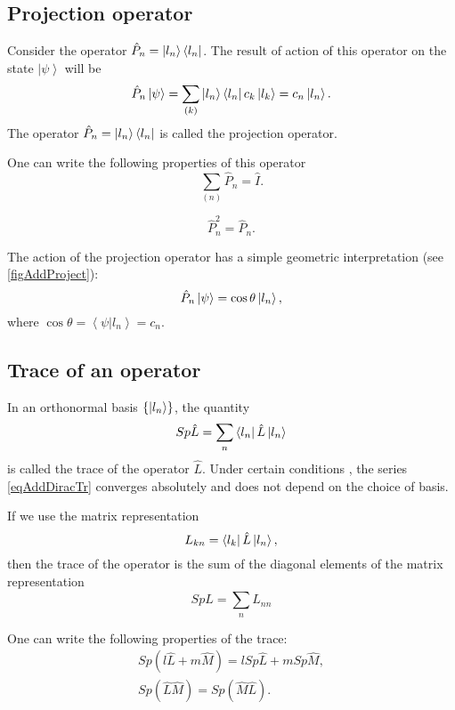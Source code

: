 \subsection{Projection operator}
\label{AddDiracProjector}

Consider the operator \(\hat{P}_n = \ket{ l_n } \left< l_n
\right|\). 
The result of action of this operator on the state 
\(\left| \psi \right>\) will be
\begin{equation}
\hat{P}_n \left| \psi \right> = \sum_{(k)} \ket{ l_n } \left<
l_n \right| c_k \ket{ l_k } = c_n \ket{ l_n }.
\label{eqDiracProektor}
\end{equation}
The operator \(\hat{P}_n = \ket{ l_n } \bra{ l_n }\) is called
the projection operator.

One can write the following properties of this operator
\begin{equation}  
\sum_{(n)} \hat{P}_n = \hat{I}.
\end{equation}  

\begin{equation}  
\hat{P}_n^2 = \hat{P}_n.
\end{equation}  


The action of the projection operator has a simple geometric
interpretation (see \autoref{figAddProject}):
\[
\hat{P}_n\left|\psi\right> = \cos{\theta} \ket{l_n},
\]
where $\cos{\theta} = \left<\psi|l_n\right> = c_n$. 

\subsection{Trace of an operator}
\label{AddDiracTrace}
In an orthonormal basis \(\left\{\ket{l_n}\right\}\), 
the quantity 
\begin{equation}  
Sp \hat{L} = \sum_n \bra{l_n} \hat{L} \ket{l_n}
\label{eqAddDiracTr}
\end{equation}  
is called the trace of the operator \(\hat{L}\). Under certain conditions
\cite{bTraceClassOperatorAdd1}, the series \ref{eqAddDiracTr}
converges absolutely and does not depend on the choice of basis.

If we use the matrix representation 
\[
L_{kn} = \bra{l_k} \hat{L} \ket{l_n}, 
\]
then the trace of the operator is the sum of the diagonal elements of the matrix 
representation
\[
Sp \hat{L} = \sum_n L_{nn}
\]

One can write the following properties of the trace:
\begin{eqnarray}
Sp\left(l \hat{L} + m \hat{M}\right) = 
l Sp \hat{L} + m Sp \hat{M},
\nonumber \\
Sp\left(\hat{L}\hat{M}\right) = 
Sp\left(\hat{M}\hat{L}\right).
\label{eqAddDiracTrProperty}
\end{eqnarray}

